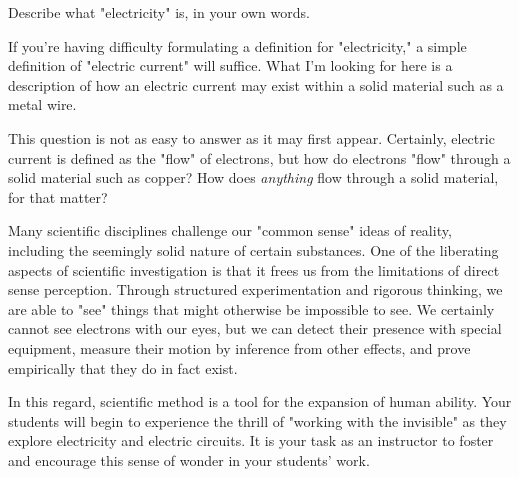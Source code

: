 

Describe what "electricity" is, in your own words.







If you're having difficulty formulating a definition for "electricity," a simple definition of "electric current" will suffice.  What I'm looking for here is a description of how an electric current may exist within a solid material such as a metal wire.







This question is not as easy to answer as it may first appear.  Certainly, electric current is defined as the "flow" of electrons, but how do electrons "flow" through a solid material such as copper?  How does {\it anything} flow through a solid material, for that matter?

Many scientific disciplines challenge our "common sense" ideas of reality, including the seemingly solid nature of certain substances.  One of the liberating aspects of scientific investigation is that it frees us from the limitations of direct sense perception.  Through structured experimentation and rigorous thinking, we are able to "see" things that might otherwise be impossible to see.  We certainly cannot see electrons with our eyes, but we can detect their presence with special equipment, measure their motion by inference from other effects, and prove empirically that they do in fact exist.

In this regard, scientific method is a tool for the expansion of human ability.  Your students will begin to experience the thrill of "working with the invisible" as they explore electricity and electric circuits.  It is your task as an instructor to foster and encourage this sense of wonder in your students' work.





